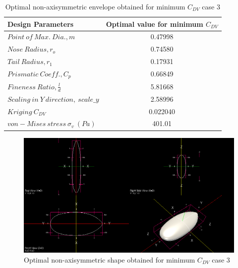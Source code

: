 \begin{table}[H]
	\centering
	\caption{Optimal non-axisymmetric envelope obtained for minimum $ C_{DV} $ case 3}
	\label{Optimal non-axisymmetric body obtained for mimimum Cdv}
	\begin{tabular}{lc}
		\hline \hline
		Design Parameters & Optimal value for minimum $ C_{DV} $    \\ \hline \hline
		$ Point\ of\ Max.\ Dia., m$ & 0.47998      \\  
		$ Nose\ Radius, r _{o} $ & 0.74580    \\
		$ Tail\ Radius, r _{1} $ & 0.17931     \\  
		$ Prismatic\ Coeff., C _{p }$ & 0.66849 \\
		$ Fineness\ Ratio, \frac{l}{d} $ & 5.81668 \\
		$Scaling\ in\ Y\ direction,\ scale\_y$ & 2.58996 \\ \hline \hline
		
		
		$ Kriging\ C_{DV} $ & 0.022040 \\
		$ von-Mises\ stress\  \sigma _{v} \ (Pa) $ & 401.01 \\
		
		\hline \hline
	\end{tabular}
\end{table}

\begin{figure}[H]
	\centering
	\includegraphics[width=450 pt]{rnd/min_cdv_case3.png}
	\caption{Optimal non-axisymmetric shape obtained for minimum $ C_{DV} $ case 3}
	\label{Optimal min cdv} %
\end{figure}

